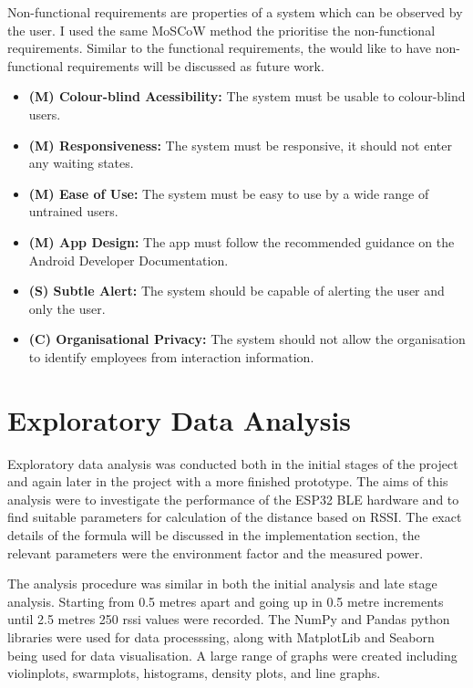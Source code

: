 \documentclass{l4proj}
\begin{document}
Non-functional requirements are properties of a system which can be observed by the user. I used the same MoSCoW method the prioritise the non-functional requirements. Similar to the functional requirements, the would like to have non-functional requirements will be discussed as future work.

\begin{itemize}
    \item \textbf{(M) Colour-blind Acessibility: } The system must be usable to colour-blind users.
    \item \textbf{(M) Responsiveness: } The system must be responsive, it should not enter any waiting states.
    \item \textbf{(M) Ease of Use: } The system must be easy to use by a wide range of untrained users.
    \item \textbf{(M) App Design: } The app must follow the recommended guidance on the Android Developer Documentation.
    \item \textbf{(S) Subtle Alert: } The system should be capable of alerting the user and only the user.
    \item \textbf{(C) Organisational Privacy: } The system should not allow the organisation to identify employees from interaction information.
\end{itemize}

\section{Exploratory Data Analysis}

Exploratory data analysis was conducted both in the initial stages of the project and again later in the project with a more finished prototype. The aims of this analysis were to investigate the performance of the ESP32 BLE hardware and to find suitable parameters for calculation of the distance based on RSSI. The exact details of the formula will be discussed in the implementation section, the relevant parameters were the environment factor and the measured power.

The analysis procedure was similar in both the initial analysis and late stage analysis.  Starting from 0.5 metres apart and going up in 0.5 metre increments until 2.5 metres 250 rssi values were recorded. The NumPy and Pandas python libraries were used for data processsing, along with MatplotLib and Seaborn being used for data visualisation. A large range of graphs were created including violinplots, swarmplots, histograms, density plots, and line graphs.
\end{document}
